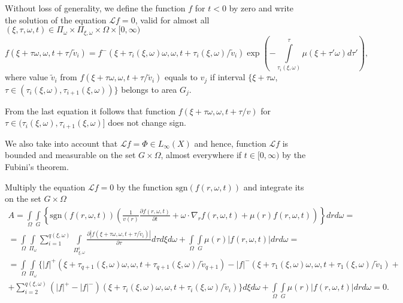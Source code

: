 \documentclass[12pt,reqno]{report}
\def\sgn{\mathrm{sgn}}
\begin{document}
Without loss of generality, we define the function $f$ for $t < 0$ by zero and write 
the solution of the equation ${\mathcal L} f = 0$, valid for almost all $(\xi,\tau,\omega,t) \in \Pi_{\omega} \times
\Pi_{\xi,\omega} \times \Omega \times [0,\infty)$
$$
f(\xi+\tau\omega,\omega,t+\tau/\tilde{v}_i)=f^-(\xi+\tau_i (\xi,\omega)
\omega,\omega, t+\tau_i (\xi,\omega)/\tilde{v}_i) \exp \left ( - \int
\limits^{\tau}_{\tau_i(\xi,\omega)} \mu(\xi+\tau'\omega) d\tau'
\right ),
$$
where value $\tilde{v}_i$ from $f(\xi+\tau\omega,\omega,t+\tau/\tilde{v}_i)$ equals to $v_j$ 
if interval $\{\xi+\tau\omega$, $\tau\in (\tau_i(\xi,\omega), \tau_{i+1}(\xi,\omega))\}$ belongs to area $G_j$. 

From the last equation it follows that function
$f(\xi+\tau\omega,\omega,t+\tau/v)$ for $\tau \in
(\tau_i(\xi,\omega), \tau_{i+1}(\xi,\omega)]$ does not change sign.

We also take into account that ${\mathcal L f} = \Phi \in L_{\infty}(X)$ and hence, 
function ${\mathcal L f}$ is bounded and measurable on the set $G\times \Omega$, almost everywhere if $t\in[0,\infty)$ 
by the Fubini's theorem.

Multiply the equation ${\mathcal L}f=0$ by the function $ {\sgn}
(f(r,\omega,t))$ and integrate its on the set $G\times \Omega$
\begin{multline}
A=\int \limits_{\Omega} \int \limits_G \left \{ {\sgn}
(f(r,\omega,t))\left(\frac{1}{v(r)} \frac{\partial
	f(r,\omega,t)}{\partial t} +\omega \cdot \nabla_r f(r,\omega,t) +
\mu (r) f(r,\omega,t)\right)\right \}
dr d\omega=
\\
= \int \limits_{\Omega} \int \limits_{\Pi_{\omega}} \sum
\limits^{q(\xi,\omega)}_{i=1} \int \limits_{\Pi^i_{\xi,\omega}}
\frac{\partial |f(\xi+\tau\omega,\omega,t+\tau/\tilde{v}_i)|}{\partial \tau}
d\tau d \xi d \omega +\int \limits_{\Omega} \int \limits_G \mu (r)
|f(r,\omega,t)|
dr d\omega= \\
=
\int \limits_{\Omega} \int \limits_{\Pi_{\omega}}\{
|f|^+(\xi+\tau_{q+1}
(\xi,\omega) \omega,\omega,t+\tau_{q+1}(\xi,\omega)/\tilde{v}_{q+1}) -
|f|^-(\xi+\tau_{1} (\xi,\omega) \omega,\omega,t+\tau_{1}(\xi,\omega)/\tilde{v}_{1})
+
\\+
\sum \limits^{q(\xi,\omega)}_{i=2}
(|f|^+ - |f|^-)(\xi+\tau_i (\xi,\omega)
\omega,\omega, t+\tau_i (\xi,\omega)/\tilde{v}_i)\} d\xi d\omega + \int
\limits_{\Omega} \int \limits_G \mu(r) |f(r,\omega,t)| dr d\omega
= 0.
\end{multline}
\end{document}
